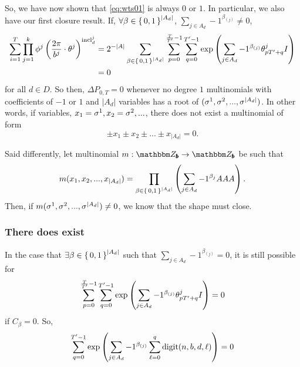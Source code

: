 So, we have now shown that \eqref{eq:wts01} is always $0$ or $1$. In particular, we also have our first 
closure result. If, $\forall \beta \in \set{0, 1}^{|A_d|}$, $\sum_{j \in A_d} -1 ^ {\beta_{(j)}} \neq 0$,
\begin{align*}
  \sum_{i = 1}^T \prod_{j=1}^k \phi^j\left(\frac{2\pi}{b^j} \cdot \theta^j\right) ^ {{\mathrm{incl}_{d}^{j}}} &=  2^{-|A|} 
  \sum_{\beta \in \set{0,1}^{|A_d|}} 
      \sum_{p= 0}^{\frac{T}{{T}'} - 1} \sum_{q = 0}^{{T}' - 1}
     \exp\left(
         \sum_{j \in A_d} -1 ^ {\beta_{(j)}}
         {\theta^j_{p {T}' + q}}I
       \right) \\
        &= 0
\end{align*}
for all $d \in D$.
So then, $\Delta P_{0, T} = 0$ whenever 
no degree $1$ multinomials with coefficients of $-1$ or $1$ and $|A_d|$ variables has a root of $({\sigma}^1, {\sigma}^2, ..., {\sigma}^{|A_d|})$.
In other words, if variables, $x_1 = {\sigma}^1, x_2 = {\sigma}^2, ...$, there does not exist a multinomial
of form 
$$
  \pm x_1 \pm x_2 \pm ... \pm x_{|A_d|} = 0.
$$

Said differently, let multinomial $m: \Z_{\commonBase} \rightarrow \Z_{\commonBase}$ be such that
\begin{equation*}
  m(x_1, x_2, ..., x_{|A_d|}) = \prod_{\beta \in \set{0, 1}^{|A_d|}} \left(\sum_{j \in A_d} -1^{\beta_j}AAA \right).
\end{equation*}
Then, if $m({\sigma}^1, {\sigma}^2, ..., {\sigma}^{|A_d|}) \neq 0$,
we know that the shape must close.


\subsubsection*{There does exist}

In the case that $\exists \beta \in \set{0, 1}^{|A_d|}$ such that $\sum_{j \in A_d} -1 ^ {\beta_{(j)}} = 0$, it is still possible
for
$$
\sum_{p= 0}^{\frac{T}{{T}'} - 1} \sum_{q = 0}^{{T}' - 1} \exp\left( \sum_{j \in A_d} -1 ^ {\beta_{(j)}} {\theta^j_{p {T}' + q}}I \right) = 0
$$
if $C_\beta = 0$. So, 
\begin{equation*}
  \sum_{q = 0}^{{T}' - 1}
  \exp\left(
      \sum_{j \in A_d} -1 ^ {\beta_{(j)}}
        \sum_{\ell = 0}^{q}\mathrm{digit}(n, b, d, \ell)
  \right) = 0
\end{equation*}

